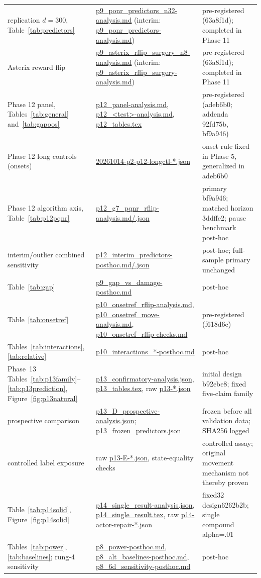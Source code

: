 \documentclass[10pt]{article} %
\begin{document}
\begin{table}[h]
\begin{tabular}{p{3.0cm}p{7.6cm}p{4.0cm}}
replication $d=300$, Table~\ref{tab:predictors} & \url{p9_ponr_predictors_n32-analysis.md} (interim: \url{p9_ponr_predictors-analysis.md}) & pre-registered (63a8f1d); completed in Phase 11 \\
Asterix reward flip & \url{p9_asterix_rflip_surgery_n8-analysis.md} (interim: \url{p9_asterix_rflip_surgery-analysis.md}) & pre-registered (63a8f1d); completed in Phase 11 \\
Phase 12 panel, Tables~\ref{tab:general} and~\ref{tab:gapoos} & \url{p12_panel-analysis.md}, \url{p12_<test>-analysis.md}, \url{p12_tables.tex} & pre-registered (adeb6b0; addenda 92fd75b, bf9a946) \\
Phase 12 long controls (onsets) & \url{20261014-p2-p12-longctl-*.json} & onset rule fixed in Phase 5, generalized in adeb6b0 \\
Phase 12 algorithm axis, Table~\ref{tab:p12pqnr} & \url{p12_g7_pqnr_rflip-analysis.md/.json} & primary bf9a946; matched horizon 3ddffe2; pause benchmark post-hoc \\
interim/outlier combined sensitivity & \url{p12_interim_predictors-posthoc.md/.json} & post-hoc; full-sample primary unchanged \\

Table~\ref{tab:gap} & \url{p9_gap_vs_damage-posthoc.md} & post-hoc \\
Table~\ref{tab:onsetref} & \url{p10_onsetref_rflip-analysis.md}, \url{p10_onsetref_move-analysis.md}, \url{p10_onsetref_rflip-checks.md} & pre-registered (f618d6c) \\
Tables~\ref{tab:interactions}, \ref{tab:relative} & \url{p10_interactions_*-posthoc.md} & post-hoc \\
Phase~13 Tables~\ref{tab:p13family}--\ref{tab:p13prediction}, Figure~\ref{fig:p13natural} & \url{p13_confirmatory-analysis.json}, \url{p13_tables.tex}, raw \url{p13-*.json} & initial design b92ebe8; fixed five-claim family \\
prospective comparison & \url{p13_D_prospective-analysis.json}; \url{p13_frozen_predictors.json} & frozen before all validation data; SHA256 logged \\
controlled label exposure & raw \url{p13-E-*.json}, state-equality checks & controlled assay; original movement mechanism not thereby proven \\
Table~\ref{tab:p14solid}, Figure~\ref{fig:p14solid} & \url{p14_single_result-analysis.json}, \url{p14_single_result.tex}, raw \url{p14-actor-repair-*.json} & fixed32 design6262b2b; single compound alpha=.01 \\

Tables~\ref{tab:power}, \ref{tab:baselines}; rung-4 sensitivity & \url{p8_power-posthoc.md}, \url{p8_alt_baselines-posthoc.md}, \url{p8_6d_sensitivity-posthoc.md} & post-hoc \\
\bottomrule
\end{tabular}
\end{table}
\end{document}
